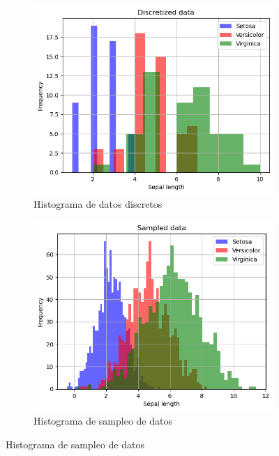 \documentclass[11pt]{article}
\begin{document}
\begin{figure}[h]
\begin{subfigure}[h]{0.5\linewidth}
    \centering
    \includegraphics[width=\linewidth]{notebooks_clase_1/discretized_data_hist.png}
    \caption{Histograma de datos discretos}
    \label{fig:discrete}
\end{subfigure}
\begin{subfigure}[h]{0.5\linewidth}
    \centering
    \includegraphics[width=\linewidth]{notebooks_clase_1/sampled_data_hist.png}
    \caption{Histograma de sampleo de datos}
    \label{fig:sampled}
\end{subfigure}
\end{figure}
\end{document}
